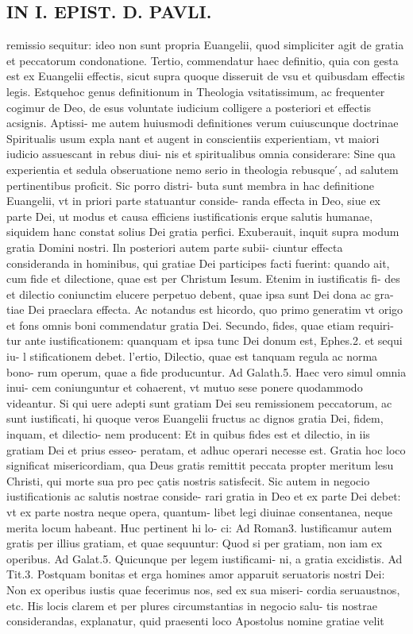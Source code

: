 \documentclass{article}
\begin{document}
\begin{pages}
\section*{IN I. EPIST. D. PAVLI. }
\marginpar{[ p.45 ]}\pstart remissio sequitur: ideo non sunt propria Euangelii, quod simpliciter agit de gratia et peccatorum condonatione. Tertio, commendatur haec definitio, quia con gesta est ex Euangelii effectis, sicut supra quoque disseruit de vsu et quibusdam effectis legis. Estquehoc genus definitionum in Theologia vsitatissimum, ac frequenter cogimur de Deo, de esus voluntate iudicium colligere a posteriori et effectis acsignis. Aptissi- me autem huiusmodi definitiones verum cuiuscunque  doctrinae Spiritualis usum expla nant et augent in conscientiis experientiam, vt maiori iudicio assuescant in rebus diui- nis et spiritualibus omnia considerare: Sine qua experientia et sedula obseruatione nemo serio in theologia rebusque ́, ad salutem pertinentibus proficit. Sic porro distri- buta sunt membra in hac definitione Euangelii, vt in priori parte statuantur conside- randa effecta in Deo, siue ex parte Dei, ut modus et causa efficiens iustificationis erque  salutis humanae, siquidem hanc constat solius Dei gratia perfici.  \pend\pstart Exuberauit, inquit supra modum gratia Domini nostri. Iln posteriori autem parte subii- ciuntur effecta consideranda in hominibus, qui gratiae Dei participes facti fuerint: quando ait, cum fide et dilectione, quae est per Christum Iesum. Etenim in iustificatis fi- des et dilectio coniunctim elucere perpetuo debent, quae ipsa sunt Dei dona ac gra- tiae Dei praeclara effecta. Ac notandus est hicordo, quo primo generatim vt origo et fons omnis boni commendatur gratia Dei. Secundo, fides, quae etiam requiri- tur ante iustificationem: quanquam et ipsa tunc Dei donum est, Ephes.2. et sequi iu- l stificationem debet. l’ertio, Dilectio, quae est tanquam regula ac norma bono- rum operum, quae a fide producuntur. Ad Galath.5. Haec vero simul omnia inui- cem coniunguntur et cohaerent, vt mutuo sese ponere quodammodo videantur. Si qui uere adepti sunt gratiam Dei seu remissionem peccatorum, ac sunt iustificati, hi quoque veros Euangelii fructus ac dignos gratia Dei, fidem, inquam, et dilectio- nem producent: Et in quibus fides est et dilectio, in iis gratiam Dei et prius esseo- peratam, et adhuc operari necesse est. Gratia hoc loco significat misericordiam, qua Deus gratis remittit peccata propter meritum lesu Christi, qui morte sua pro pec çatis nostris satisfecit. Sic autem in negocio iustificationis ac salutis nostrae conside- rari gratia in Deo et ex parte Dei debet: vt ex parte nostra neque opera, quantum- libet legi diuinae consentanea, neque merita locum habeant. Huc pertinent hi lo- ci: Ad Roman3. lustificamur autem gratis per illius gratiam, et quae sequuntur: Quod si per gratiam, non iam ex operibus. Ad Galat.5. Quicunque  per legem iustificami- ni, a gratia excidistis. Ad Tit.3. Postquam bonitas et erga homines amor apparuit seruatoris nostri Dei: Non ex operibus iustis quae fecerimus nos, sed ex sua miseri- cordia seruaustnos, etc. His locis clarem et per plures circumstantias in negocio salu- tis nostrae considerandas, explanatur, quid praesenti loco Apostolus nomine gratiae velit 
\end{pages}
\end{document}
